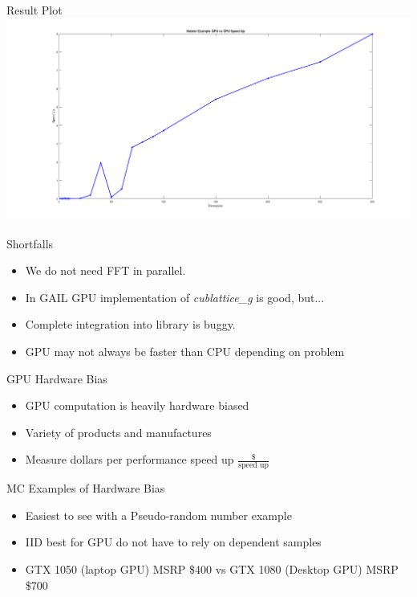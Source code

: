 \documentclass[11pt]{beamer}
\begin{document}
\begin{frame}{Result Plot}
\includegraphics[width=\textwidth]{Keister_speed.png} 
\end{frame}

\begin{frame}{Shortfalls}
\begin{itemize}
\item We do not need FFT in parallel.
\item In GAIL GPU implementation of \textit{cublattice\_g} is good, but...
\item Complete integration into library is buggy.
\item GPU may not always be faster than CPU depending on problem
\end{itemize}
\end{frame}

\begin{frame}{GPU Hardware Bias}
\begin{itemize}
\item GPU computation is heavily hardware biased
\item Variety of products and manufactures
\item Measure dollars per performance speed up $\frac{\$}{\text{speed up}}$
\end{itemize}
\end{frame}

\begin{frame}{MC Examples of Hardware Bias}%
\begin{itemize}
\item Easiest to see with a Pseudo-random number example
\item IID best for GPU do not have to rely on dependent samples
\item GTX 1050 (laptop GPU) MSRP \$400 vs GTX 1080 (Desktop GPU) MSRP \$700
\end{itemize}
\end{frame}
\end{document}
